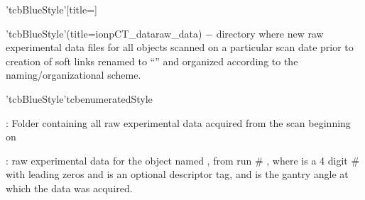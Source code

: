 \clearpage%
\begin{tcbfunctionenv}'tcbBlueStyle'[title=]
\begin{tcbparagraph}'tcbBlueStyle'(title=\dirsep ion\dirsep pCT\_data\dirsep raw\_data)%
$\boldsymbol{-}$ directory where new raw experimental data files for all objects scanned on a particular scan date prior to creation of soft links renamed to ``'' and organized according to the naming/organizational scheme.
\end{tcbparagraph}
\begin{tcbparagraph}'tcbBlueStyle'{tcbenumeratedStyle}
\begin{deepList}[labelindent=1pt, leftmargin=*]
    \item {} : Folder containing all raw experimental data acquired from the scan beginning on 
    \begin{deepList}[labelindent=1pt, leftmargin=*]
        \item {} : raw experimental data for the object named , from run \# , where  is a 4 digit \# with leading zeros and  is an optional descriptor tag, and  is the gantry angle at which the data was acquired.
    \end{deepList}
\end{deepList}
\end{tcbparagraph}
\end{tcbfunctionenv}
\endinput
